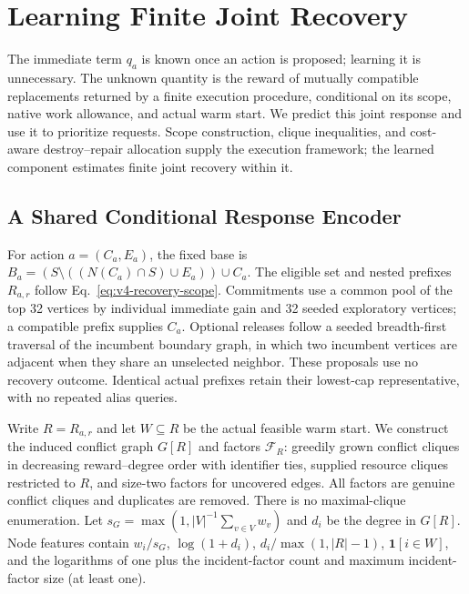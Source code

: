 \section{Learning Finite Joint Recovery}
\label{sec:method}

The immediate term $q_a$ is known once an action is proposed; learning it is
unnecessary. The unknown quantity is the reward of mutually compatible
replacements returned by a finite execution procedure, conditional on its
scope, native work allowance, and actual warm start. We predict this joint
response and use it to prioritize requests. Scope construction, clique
inequalities, and cost-aware destroy--repair allocation supply the execution
framework; the learned component estimates finite joint recovery within it.

\subsection{A Shared Conditional Response Encoder}
\label{sec:v4-response}
For action $a=(C_a,E_a)$, the fixed base is
$B_a=(S\setminus((N(C_a)\cap S)\cup E_a))\cup C_a$.
The eligible set and nested prefixes $R_{a,r}$ follow
Eq.~\eqref{eq:v4-recovery-scope}. Commitments use a common pool of the top
32 vertices by individual immediate gain and 32 seeded exploratory vertices;
a compatible prefix supplies $C_a$. Optional releases follow a seeded
breadth-first traversal of the incumbent boundary graph, in which two
incumbent vertices are adjacent when they share an unselected neighbor.
These proposals use no recovery outcome. Identical actual prefixes retain
their lowest-cap representative, with no repeated alias queries.

Write $R=R_{a,r}$ and let $W\subseteq R$ be the actual feasible warm start.
We construct the induced conflict graph $G[R]$ and factors $\mathcal F_R$:
greedily grown conflict cliques in decreasing reward--degree order with
identifier ties, supplied resource cliques restricted to $R$, and size-two
factors for uncovered edges. All factors are genuine conflict cliques and
duplicates are removed. There is no maximal-clique enumeration. Let
$s_G=\max(1,|V|^{-1}\sum_{v\in V}w_v)$ and $d_i$ be the degree in $G[R]$.
Node features contain $w_i/s_G$, $\log(1+d_i)$,
$d_i/\max(1,|R|-1)$, $\mathbf1[i\in W]$, and the logarithms of one plus
the incident-factor count and maximum incident-factor size (at least one).

